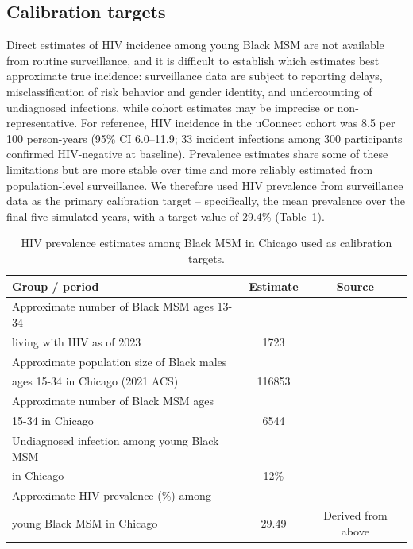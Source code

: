 \documentclass[preprint,12pt]{elsarticle}
\begin{document}
\subsection{Calibration targets}
\label{sec:supp-calibration-targets}
Direct estimates of HIV incidence among young Black MSM are not available from routine surveillance, and it is difficult to establish which estimates best approximate true incidence: surveillance data are subject to reporting delays, misclassification of risk behavior and gender identity, and undercounting of undiagnosed infections, while cohort estimates may be imprecise or non-representative. For reference, HIV incidence in the uConnect cohort was 8.5 per 100 person-years (95\% CI 6.0--11.9; 33 incident infections among 300 participants confirmed HIV-negative at baseline).\cite{lancki_preexposure_2018} Prevalence estimates share some of these limitations but are more stable over time and more reliably estimated from population-level surveillance. We therefore used HIV prevalence from surveillance data as the primary calibration target -- specifically, the mean prevalence over the final five simulated years, with a target value of 29.4\% (Table~\ref{tab:supp-prevalence}).

\begin{table}[htbp]
\centering
\caption{HIV prevalence estimates among Black MSM in Chicago used as calibration targets.}
\label{tab:supp-prevalence}
\begin{tabular}{lcc}
\toprule
Group / period & Estimate & Source \\
\midrule
Approximate number of Black MSM ages 13-34 \\
living with HIV as of 2023  & 1723 & \cite{idph_msm_plwhiv_chicago_2024} \\
Approximate population size of Black males \\
ages 15-34 in Chicago (2021 ACS) & 116853 & \cite{Census2021ACSDT5YSPT2021.B01001} \\
Approximate number of Black MSM ages \\
15-34 in Chicago & 6544 & \cite{lieb_statewide_2011, Census2021ACSDT5YSPT2021.B01001} \\
Undiagnosed infection among young Black MSM \\
in Chicago & 12\% & \cite{gtz_hiv_status_awareness_2021} \\
Approximate HIV prevalence (\%) among \\
young Black MSM in Chicago & 29.49 & Derived from above \\
\bottomrule
\end{tabular}
\end{table}
\end{document}
